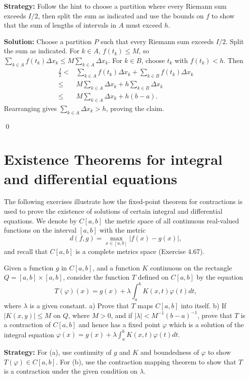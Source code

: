 \noindent\textbf{Strategy:} Follow the hint to choose a partition where every Riemann sum exceeds $I/2$, then split the sum as indicated and use the bounds on $f$ to show that the sum of lengths of intervals in $A$ must exceed $h$.

\bigskip\noindent\textbf{Solution:}
Choose a partition $P$ such that every Riemann sum exceeds $I/2$. Split the sum as indicated. For $k\in A$, $f(t_k)\le M$, so $\sum_{k\in A} f(t_k)\Delta x_k\le M\sum_{k\in A}\Delta x_k$. For $k\in B$, choose $t_k$ with $f(t_k)<h$. Then
\begin{align*}
\frac{I}{2}<&\sum_{k\in A} f(t_k)\Delta x_k+\sum_{k\in B} f(t_k)\Delta x_k\\
\le & M\sum_{k\in A}\Delta x_k + h\sum_{k\in B}\Delta x_k\\
\le & M\sum_{k\in A}\Delta x_k + h(b-a).
\end{align*}
Rearranging gives $\sum_{k\in A}\Delta x_k>h$, proving the claim.


\qed
\section{Existence Theorems for integral and differential equations}
The following exercises illustrate how the fixed-point theorem for contractions is used to prove the existence of solutions of certain integral and differential equations. We denote by $C[a, b]$ the metric space of all continuous real-valued functions on the interval $[a, b]$ with the metric $$d(f, g) = \max_{x \in [a, b]} |f(x) - g(x)|,$$ 
and recall that $C[a,b]$ is a complete metrics space (Exercise 4.67).




\begin{problembox}
Given a function $g$ in $C[a, b]$, and a function $K$ continuous on the rectangle $Q = [a, b] \times [a, b]$, consider the function $T$ defined on $C[a, b]$ by the equation 
\[T(\varphi)(x) = g(x) + \lambda \int_a^b K(x, t)\varphi(t) dt,\]
where $\lambda$ is a given constant.
a) Prove that $T$ maps $C[a, b]$ into itself.
b) If $|K(x, y)| \leq M$ on $Q$, where $M > 0$, and if $|\lambda| < M^{-1}(b - a)^{-1}$, prove that $T$ is a contraction of $C[a, b]$ and hence has a fixed point $\varphi$ which is a solution of the integral equation $\varphi(x) = g(x) + \lambda \int_a^b K(x, t)\varphi(t) dt$.
\end{problembox}

\noindent\textbf{Strategy:} For (a), use continuity of $g$ and $K$ and boundedness of $\varphi$ to show $T(\varphi) \in C[a,b]$. For (b), use the contraction mapping theorem to show that $T$ is a contraction under the given condition on $\lambda$.

